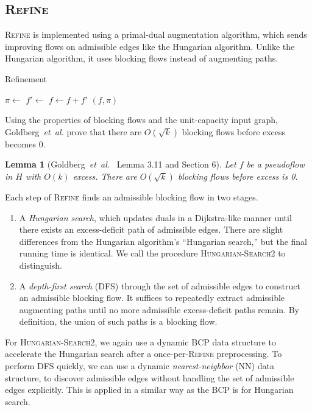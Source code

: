 \documentclass[11pt]{article}
\def\etal{\textsl{et~al.}}
\theoremstyle{plain}
\newtheorem{lemma}{Lemma}
\begin{document}
\subsection{\textsc{Refine}}

\textsc{Refine} is implemented using a primal-dual augmentation algorithm, 
which sends improving flows on admissible edges like the Hungarian algorithm.
Unlike the Hungarian algorithm, it uses blocking flows instead of augmenting 
paths.

\begin{algorithm}
\caption{Refinement}
\begin{algorithmic}[1]
		\State $\pi \gets$ 
		\State $f' \gets$ 
		\State $f \gets f + f'$
	\EndWhile
	\State\Return $(f, \pi)$
\EndFunction
\end{algorithmic}
\end{algorithm}

Using the properties of blocking flows and the unit-capacity input graph, 
Goldberg~{\etal} prove that there are $O(\sqrt{k})$ blocking flows before 
excess becomes 0.

\begin{lemma}[Goldberg~{\etal}~\cite{GHKT17} Lemma 3.11 and Section 6]
	Let $f$ be a pseudoflow in $H$ with $O(k)$ excess. 
	There are $O(\sqrt{k})$ blocking flows before excess is 0.
\end{lemma}

Each step of \textsc{Refine} finds an admissible blocking flow in two stages.
\begin{enumerate}
\item A \emph{Hungarian search}, which updates duals in a Dijkstra-like 
	manner until there exists an excess-deficit path of admissible edges.
	There are slight differences from the Hungarian algorithm's ``Hungarian 
	search,'' but the final running time is identical.
	We call the procedure \textsc{Hungarian-Search2} to distinguish.

\item A \emph{depth-first search} (\textsc{DFS}) through the set of admissible 
	edges to construct an admissible blocking flow.
	It suffices to repeatedly extract admissible augmenting paths until
	no more admissible excess-deficit paths remain.
	By definition, the union of such paths is a blocking flow.
\end{enumerate}
For \textsc{Hungarian-Search2}, we again use a dynamic BCP data structure to 
accelerate the Hungarian search after a once-per-\textsc{Refine} preprocessing.
To perform \textsc{DFS} quickly, we can use a dynamic \emph{nearest-neighbor} 
(NN) data structure, to discover admissible edges without handling the set of 
admissible edges explicitly. 
This is applied in a similar way as the BCP is for Hungarian search.
\end{document}
